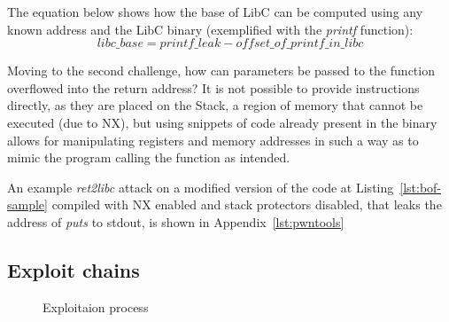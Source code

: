 \documentclass{article}
\begin{document}
The equation below shows how the base of LibC can be computed using any known address and the LibC binary (exemplified with the \emph{printf} function):
\begin{equation}
  libc\_{base} = printf\_leak - offset\_{of}\_{printf}\_{in}\_{libc}
\end{equation}

Moving to the second challenge, how can parameters be passed to the function overflowed into the return address? It is not possible to provide instructions directly, as they are placed on the Stack, a region of memory that cannot be executed (due to NX), but using snippets of code already present in the binary allows for manipulating registers and memory addresses in such a way as to mimic the program calling the function as intended.

An example \emph{ret2libc} attack on a modified version of the code at Listing~\ref{lst:bof-sample} compiled with NX enabled and stack protectors disabled, that leaks the address of \emph{puts} to stdout, is shown in Appendix~\ref{lst:pwntools}

\subsection{Exploit chains}
\begin{figure}[H]
  \centering
  \caption{Exploitaion process} \label{pic:process}
\end{figure}
\end{document}
